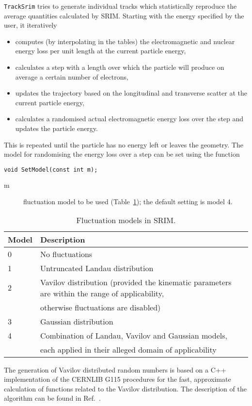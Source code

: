 \texttt{TrackSrim} tries to generate individual tracks which statistically 
reproduce the average quantities calculated by SRIM.
Starting with the energy specified by the user, it iteratively
\begin{itemize}
\item
computes (by interpolating in the tables)  
the electromagnetic and nuclear energy loss per unit length at the 
current particle energy,
\item
calculates a step with a length over which the particle will 
produce on average a certain number of electrons,
\item
updates the trajectory based on the longitudinal and transverse scatter 
at the current particle energy,
\item 
calculates a randomised actual electromagnetic energy loss over the step 
and updates the particle energy.
\end{itemize}
This is repeated until the particle has no energy left or leaves the geometry.
The model for randomising the energy loss over a step can be set using 
the function 
\begin{lstlisting}
void SetModel(const int m);
\end{lstlisting}
\begin{description}
\item[m] fluctuation model to be used (Table~\ref{Tab:SrimFluctuationModels}); the default setting is model 4.
\end{description}
\begin{table}
  \centering
  \begin{tabular}{l l}
    \toprule
    Model & Description \\
    \midrule
    0 & No fluctuations \\
    1 & Untruncated Landau distribution \\
    2 & Vavilov distribution (provided the kinematic parameters are within the range of applicability, \\
      & otherwise fluctuations are disabled) \\
    3 & Gaussian distribution \\
    4 & Combination of Landau, Vavilov and Gaussian models, \\
      & each applied in their alleged domain of applicability \\
    \bottomrule
  \end{tabular}
  \caption{Fluctuation models in SRIM.}
  \label{Tab:SrimFluctuationModels}
\end{table}
The generation of Vavilov distributed random numbers is based on a 
C++ implementation of the CERNLIB G115 procedures for the 
fast, approximate calculation of functions related to the 
Vavilov distribution. The description of the algorithm can be found 
in Ref.~\cite{RotondiMontagna1990}.

